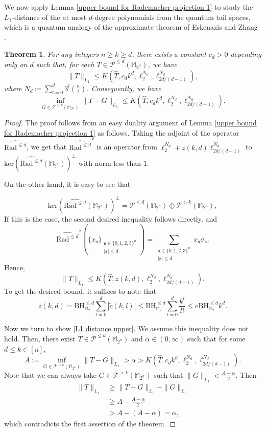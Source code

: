\documentclass{amsbook}
\newtheorem{theorem}{Theorem}[chapter]
\theoremstyle{definition}
\theoremstyle{remark}
\numberwithin{section}{chapter}
\numberwithin{equation}{chapter}
\newcommand{\M}{\mathbb{M}}
\newcommand{\1}{\mathbf{1}}
\newcommand{\s}{\mathbf{s}}
\begin{document}
We now apply Lemma \ref{upper bound for Rademacher projection 1} to study the $L_1$-distance of the at most $d$-degree polynomials from the quantum tail spaces, which is 
 a quantum analogy of the approximate theorem of Eskenazis and Zhang \cite[Theorem 3]{EZ2024}.
\begin{theorem}\label{EZ theorem 1}
For any integers $n\geq k\geq d$, there exists a constant $c_{d}>0$ depending only on $d$ such that, for each $T\in \mathcal{P}^{\leq d}(\M_{2^n})$, we have
\[
\|T\|_{L_{1}}\leq K\left(\widehat{T},c_{d}k^{d},\ell^{N_{d}}_{2},\ell^{N_{d}}_{2d/(d-1)}\right),
\]
where $N_{d}\coloneqq \sum_{l=0}^{d}3^{l}\binom{n}{l}$. Consequently, we have
\begin{equation}\label{L1 distance upper}
\inf_{G\in \mathcal{T}^{>k}(\M_{2^n})}\|T-G\|_{L_{1}}\leq K(\widehat{T},c_{d}k^{d},\ell^{N_{d}}_{2},\ell^{N_{d}}_{2d/(d-1)}).
\end{equation}
\end{theorem}
\begin{proof}
The proof follows from an easy duality argument of Lemma \ref{upper bound for Rademacher projection 1} as follows. Taking the adjoint of the operator $\widehat{\mathrm{Rad}^{\leq d}}$, we get that $\widehat{\mathrm{Rad}^{\leq d}}^{*}$ is an operator from $\ell^{N_{d}}_{2}+z(k,d)\ell^{N_{d}}_{2d/(d-1)}$ to $\mathrm{ker}(\widehat{\mathrm{Rad}^{\leq d}}(\M_{2^n}))^{\bot}$ with norm less than $1$.

On the other hand, it is easy to see that


\[
\mathrm{ker}(\widehat{\mathrm{Rad}^{\leq d}}(\M_{2^n}))^{\bot}=\mathcal{P}^{\leq d}(\M_{2^n})\oplus\mathcal P^{>k}(\M_{2^n}), 
\]
If this is the case, the second desired  inequality follows directly.
and
\[
\widehat{\mathrm{Rad}^{\leq d}}^{*}\left(\{x_{\s}\}_{\substack{\s\in \{0,1,2,3\}^{n}\\|\s|\leq d}}\right)=\sum_{\substack{\s\in\{0,1,2,3\}^{n}\\|\s|\leq d}}x_{\s}\sigma_{\s}.
\]
Hence,
\[
\|T\|_{L_{1}}\leq K(\widehat{T},z(k,d),\ell^{N_{d}}_{2},\ell^{N_{d}}_{2d/(d-1)}).
\]
To get the desired bound, it suffices to note that
\[
z(k,d)=\mathrm{BH}_{\mathbb{M}_2}^{\leq d}\sum_{l=0}^{d}|\tilde{c}(k,l)|\leq \mathrm{BH}_{\mathbb{M}_2}^{\leq d}\sum_{l=0}^{d}\frac{k^{l}}{l!}\leq e\mathrm{BH}_{\mathbb{M}_2}^{\leq d}k^{d}.
\]

Now we turn to show \eqref{L1 distance upper}. We assume this inequality does not hold. Then, there exist $T\in \mathcal{P}^{\leq d}(\M_{2^n})$ and $\alpha\in (0,\infty)$ such that for some $d\leq k \in [n]$,
\[A:=\inf_{G\in \mathcal{T}^{>k}(\M_{2^n})}\|T-G\|_{L_{1}}> \alpha > K(\widehat{T},c_{d}k^{d},\ell^{N_{d}}_{2},\ell^{N_{d}}_{2d/(d-1)}).\]
Note that we can always take $G\in \mathcal{T}^{>k}(\M_{2^n})$ such that $\|G\|_{L_1}<\frac{A-\alpha}{2}$. Then
\begin{align*}
\|T\|_{L_1}&\geq \|T-G\|_{L_1}-\|G\|_{L_1}\\
&\geq A-\frac{A-\alpha}{2}\\
&>A-(A-\alpha)=\alpha,
\end{align*}
which contradicts the first assertion of the theorem. 
\end{proof}
\end{document}

